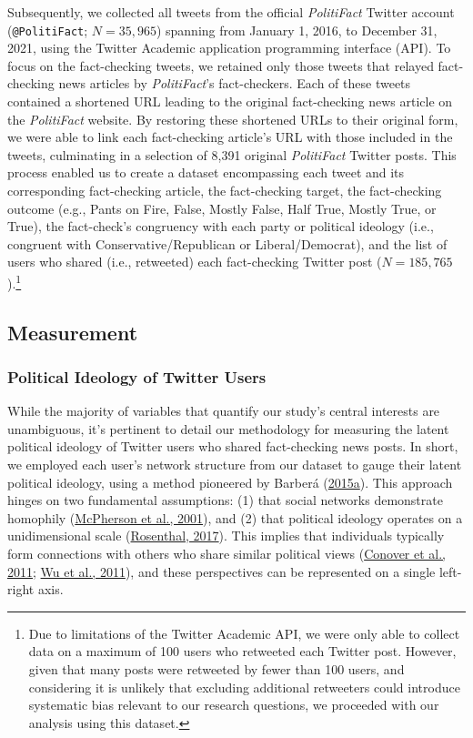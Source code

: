 \documentclass[
  12pt,
]{article}
\begin{document}
Subsequently, we collected all tweets from the official
\emph{PolitiFact} Twitter account (\texttt{@PolitiFact}; \(N = 35,965\))
spanning from January 1, 2016, to December 31, 2021, using the Twitter
Academic application programming interface (API). To focus on the
fact-checking tweets, we retained only those tweets that relayed
fact-checking news articles by \emph{PolitiFact}'s fact-checkers. Each
of these tweets contained a shortened URL leading to the original
fact-checking news article on the \emph{PolitiFact} website. By
restoring these shortened URLs to their original form, we were able to
link each fact-checking article's URL with those included in the tweets,
culminating in a selection of 8,391 original \emph{PolitiFact} Twitter
posts. This process enabled us to create a dataset encompassing each
tweet and its corresponding fact-checking article, the fact-checking
target, the fact-checking outcome (e.g., Pants on Fire, False, Mostly
False, Half True, Mostly True, or True), the fact-check's congruency
with each party or political ideology (i.e., congruent with
Conservative/Republican or Liberal/Democrat), and the list of users who
shared (i.e., retweeted) each fact-checking Twitter post
(\(N = 185,765\)).\footnote{Due to limitations of the Twitter Academic
  API, we were only able to collect data on a maximum of 100 users who
  retweeted each Twitter post. However, given that many posts were
  retweeted by fewer than 100 users, and considering it is unlikely that
  excluding additional retweeters could introduce systematic bias
  relevant to our research questions, we proceeded with our analysis
  using this dataset.}

\hypertarget{measurement}{%
\subsection{Measurement}\label{measurement}}

\hypertarget{political-ideology-of-twitter-users}{%
\subsubsection{Political Ideology of Twitter
Users}\label{political-ideology-of-twitter-users}}

While the majority of variables that quantify our study's central
interests are unambiguous, it's pertinent to detail our methodology for
measuring the latent political ideology of Twitter users who shared
fact-checking news posts. In short, we employed each user's network
structure from our dataset to gauge their latent political ideology,
using a method pioneered by Barberá
(\protect\hyperlink{ref-barbera2015birds}{2015a}). This approach hinges
on two fundamental assumptions: (1) that social networks demonstrate
homophily (\protect\hyperlink{ref-mcpherson2001birds}{McPherson et al.,
2001}), and (2) that political ideology operates on a unidimensional
scale (\protect\hyperlink{ref-rosenthal2017ideology}{Rosenthal, 2017}).
This implies that individuals typically form connections with others who
share similar political views
(\protect\hyperlink{ref-conover2011political}{Conover et al., 2011};
\protect\hyperlink{ref-wu2011says}{Wu et al., 2011}), and these
perspectives can be represented on a single left-right axis.
\end{document}
